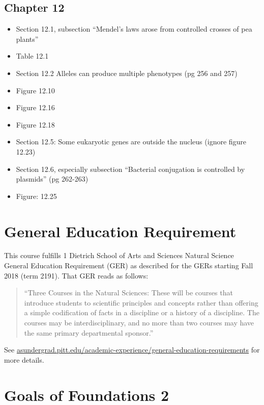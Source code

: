 \documentclass[
]{book}
\begin{document}
\hypertarget{chapter-12}{%
\section{Chapter 12}\label{chapter-12}}

\begin{itemize}
\item
  Section 12.1, subsection ``Mendel's laws arose from controlled crosses of pea plants''
\item
  Table 12.1
\item
  Section 12.2 Alleles can produce multiple phenotypes (pg 256 and 257)
\item
  Figure 12.10
\item
  Figure 12.16
\item
  Figure 12.18
\item
  Section 12.5: Some eukaryotic genes are outside the nucleus (ignore figure 12.23)
\item
  Section 12.6, especially subsection ``Bacterial conjugation is controlled by plasmids'' (pg 262-263)
\item
  Figure: 12.25
\end{itemize}

\hypertarget{general-education-requirement}{%
\chapter{General Education Requirement}\label{general-education-requirement}}

This course fulfills 1 Dietrich School of Arts and Sciences Natural Science General Education Requirement (GER) as described for the GERs starting Fall 2018 (term 2191). That GER reads as follows:

\begin{quote}
``Three Courses in the Natural Sciences: These will be courses that introduce students to scientific principles and concepts rather than offering a simple codification of facts in a discipline or a history of a discipline. The courses may be interdisciplinary, and no more than two courses may have the same primary departmental sponsor.''
\end{quote}

See \href{https://asundergrad.pitt.edu/academic-experience/general-education-requirements}{asundergrad.pitt.edu/academic-experience/general-education-requirements} for more details.

\hypertarget{goals-of-foundations-2}{%
\chapter{Goals of Foundations 2}\label{goals-of-foundations-2}}
\end{document}

